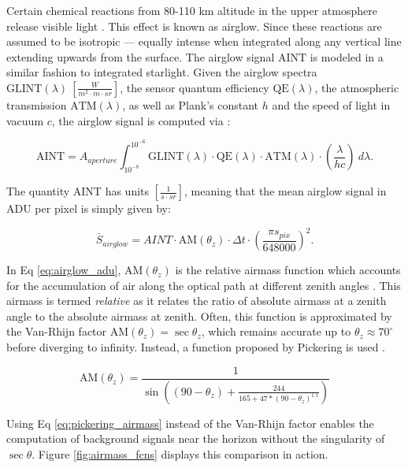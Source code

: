 Certain chemical reactions from 80-110 km altitude in the upper atmosphere release visible light
\cite{krag2003}. This effect is known as
airglow. Since these reactions are assumed to be isotropic ---  equally intense when integrated along any
vertical line extending upwards from the surface. The airglow signal $\textrm{AINT}$ is modeled in a
similar fashion to integrated starlight. Given the airglow spectra $\textrm{GLINT}(\lambda) \:
\left[ \frac{W}{m^2\cdot m \cdot sr} \right]$, the sensor quantum efficiency $\textrm{QE}(\lambda)$, the atmospheric transmission $\textrm{ATM}(\lambda)$, as well as Plank's constant $h$ and the speed of light in vacuum $c$, the airglow signal is computed via \cite{krag2003}:

\begin{equation} \label{eq:aint}
 \textrm{AINT} = A_{aperture}
  \int_{10^{-8}}^{10^{-6}}{ \textrm{GLINT}(\lambda) \cdot \textrm{QE}(\lambda) \cdot \textrm{ATM}(\lambda)
  \cdot \left( \frac{\lambda}{h c} \right) \: d\lambda}.
\end{equation}

The quantity $\textrm{AINT}$ has units $\left[ \frac{1}{s\cdot sr} \right]$, meaning that the
mean airglow signal in ADU per pixel is simply given by:

\begin{equation} \label{eq:airglow_adu}
  \bar{S}_{airglow} = AINT \cdot \textrm{AM}(\theta_z) \cdot \Delta t \cdot \left( \frac{\pi s_{pix}}{648000} \right)^2.
\end{equation}

In Eq \ref{eq:airglow_adu}, $\textrm{AM}(\theta_z)$ is the relative airmass function which accounts for the accumulation of air along the optical path at different zenith angles \cite{frueh2019notes}. This airmass is termed \textit{relative} as it relates the ratio of absolute airmass at a zenith angle to the absolute airmass at zenith. Often, this function is approximated by the Van-Rhijn factor $\textrm{AM}(\theta_z) = \sec{\theta_z}$, which remains accurate up to $\theta_z \approx 70^\circ$ before diverging to infinity. Instead, a function proposed by Pickering is used \cite{pickering2002}.

\begin{equation} \label{eq:pickering_airmass}
  \textrm{AM}(\theta_z) = \frac{1}{\sin\left((90 - \theta_z) +  \frac{244}{165 + 47 * \left(90 - \theta_z \right)^{1.1}}\right)}
\end{equation}

Using Eq \ref{eq:pickering_airmass} instead of the Van-Rhijn factor enables the computation of background signals near the horizon without the singularity of $\sec{\theta}$. Figure \ref{fig:airmass_fcns} displays this comparison in action.

